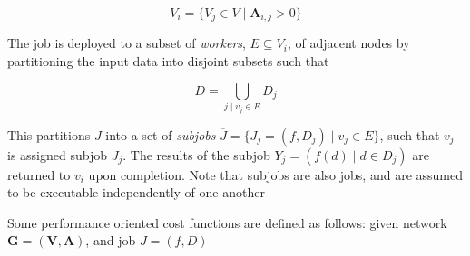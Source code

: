 \documentclass[../mthe-493-project-proposal.tex]{subfiles}
\begin{document}
    \begin{equation*}
        V_i = \{V_j \in V \mid \mathbf{A}_{i,j} > 0\}
    \end{equation*}
    
    The job is deployed to a subset of \textit{workers}, $E \subseteq V_i$, of adjacent nodes by partitioning the input data into disjoint subsets such that
    
    \begin{equation*}
        D = \bigcup\limits_{j \mid v_j \in E} D_j
    \end{equation*}
    
    This partitions $J$ into a set of \textit{subjobs} $\overline{J} = \{J_j = (f, D_j) \mid v_j \in E\}$, such that $v_j$ is assigned subjob $J_j$. The results of the subjob $Y_j = (f(d) \mid d \in D_j)$ are returned to $v_i$ upon completion. Note that subjobs are also jobs, and are assumed to be executable independently of one another
    
    Some performance oriented cost functions are defined as follows: given network $\mathbf{G} = (\mathbf{V}, \mathbf{A})$, and job $J = (f, D)$
    
\end{document}
